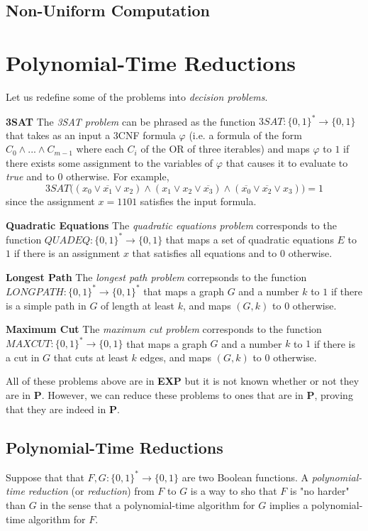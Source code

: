 \documentclass{article}
\begin{document}
  \subsection{Non-Uniform Computation}

\section{Polynomial-Time Reductions}

  Let us redefine some of the problems into \textit{decision problems}. 

  \textbf{3SAT} The \textit{3SAT problem} can be phrased as the function $3SAT: \{0,1\}^* \longrightarrow \{0,1\}$ that takes as an input a 3CNF formula $\varphi$ (i.e. a formula of the form $C_0 \wedge ... \wedge C_{m-1}$ where each $C_i$ of the OR of three iterables) and maps $\varphi$ to $1$ if there exists some assignment to the variables of $\varphi$ that causes it to evaluate to \textit{true} and to $0$ otherwise. For example, 
  \[3SAT \big( (x_0 \vee \overline{x_1} \vee x_2) \wedge (x_1 \vee x_2 \vee \overline{x_3}) \wedge (\overline{x_0} \vee \overline{x_2} \vee x_3) \big) = 1\]
  since the assignment $x = 1101$ satisfies the input formula. 

  \textbf{Quadratic Equations} The \textit{quadratic equations problem} corresponds to the function $QUADEQ: \{0,1\}^* \longrightarrow \{0,1\}$ that maps a set of quadratic equations $E$ to $1$ if there is an assignment $x$ that satisfies all equations and to $0$ otherwise. 

  \textbf{Longest Path} The \textit{longest path problem} correpsonds to the function $LONGPATH: \{0,1\}^* \longrightarrow \{0,1\}^*$ that maps a graph $G$ and a number $k$ to $1$ if there is a simple path in $G$ of length at least $k$, and maps $(G, k)$ to $0$ otherwise. 

  \textbf{Maximum Cut} The \textit{maximum cut problem} corresponds to the function $MAXCUT: \{0,1\}^* \longrightarrow \{0,1\}$ that maps a graph $G$ and a number $k$ to $1$ if there is a cut in $G$ that cuts at least $k$ edges, and maps $(G, k)$ to $0$ otherwise. 

  All of these problems above are in \textbf{EXP} but it is not known whether or not they are in \textbf{P}. However, we can reduce these problems to ones that are in \textbf{P}, proving that they are indeed in \textbf{P}. 

  \subsection{Polynomial-Time Reductions}
  Suppose that that $F, G: \{0,1\}^* \longrightarrow \{0,1\}$ are two Boolean functions. A \textit{polynomial-time reduction} (or \textit{reduction}) from $F$ to $G$ is a way to sho that $F$ is "no harder" than $G$ in the sense that a polynomial-time algorithm for $G$ implies a polynomial-time algorithm for $F$. 
\end{document}
